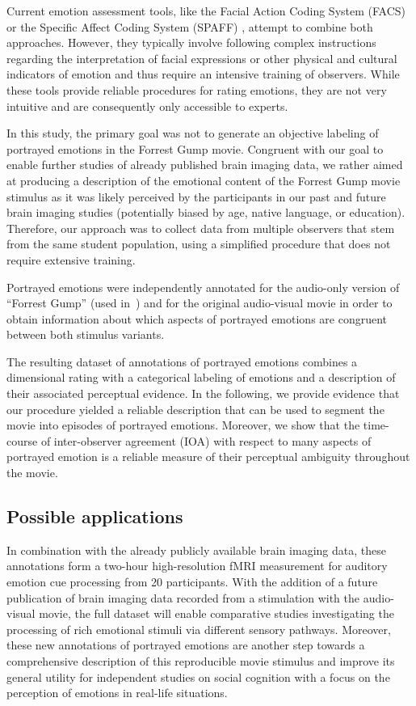 \documentclass[10pt,a4paper,twocolumn]{article}
\begin{document}
Current emotion assessment tools, like the Facial Action Coding System (FACS)
or the Specific Affect Coding System (SPAFF) \cite{CG2007}, attempt to combine
both approaches. However, they typically involve following complex instructions
regarding the interpretation of facial expressions or other physical and
cultural indicators of emotion \cite[p. 281]{CG2007} and thus require an
intensive training of observers. While these tools provide reliable procedures
for rating emotions, they are not very intuitive and are consequently only
accessible to experts.

In this study, the primary goal was not to generate an objective labeling of
portrayed emotions in the Forrest Gump movie. Congruent with our goal to
enable further studies of already published brain imaging data, we rather aimed
at producing a description of the emotional content of the Forrest Gump movie
stimulus as it was likely perceived by the participants in our past and future
brain imaging studies (potentially biased by age, native language, or
education). Therefore, our approach was to collect data from multiple observers
that stem from the same student population, using a simplified procedure that
does not require extensive training.

Portrayed emotions were independently annotated for the audio-only version of
``Forrest Gump'' (used in~\cite{HBI+14}) and for the original audio-visual
movie in order to obtain information about which aspects of portrayed emotions
are congruent between both stimulus variants.

The resulting dataset of annotations of portrayed emotions combines a
dimensional rating with a categorical labeling of emotions and a description of
their associated perceptual evidence. In the following, we provide evidence
that our procedure yielded a reliable description that can be used to segment
the movie into episodes of portrayed emotions. Moreover, we show that the
time-course of inter-observer agreement (IOA) with respect to many aspects of
portrayed emotion is a reliable measure of their perceptual ambiguity
throughout the movie.

\subsection*{Possible applications}

In combination with the already publicly available brain imaging data, these
annotations form a two-hour high-resolution fMRI measurement for auditory
emotion cue processing from 20 participants. With the addition of a future
publication of brain imaging data recorded from a stimulation with the
audio-visual movie, the full dataset will enable comparative studies
investigating the processing of rich emotional stimuli via different sensory
pathways. Moreover, these new annotations of portrayed emotions are another
step towards a comprehensive description of this reproducible movie
stimulus\cite{HBI+14} and improve its general utility for independent studies
on social cognition with a focus on the perception of emotions in real-life
situations.
\end{document}
